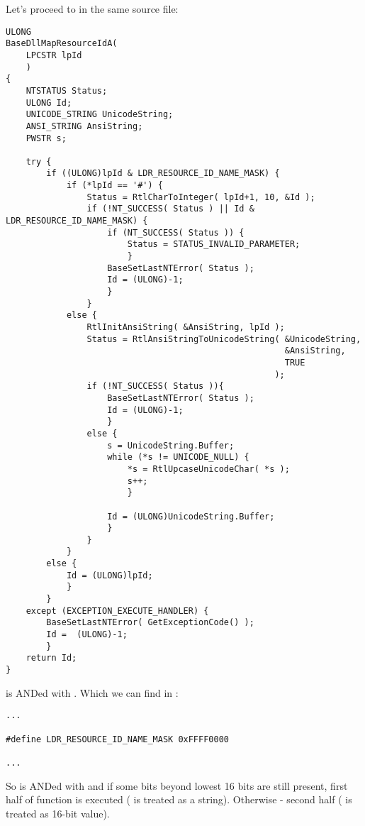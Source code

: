 Let's proceed to  in the same source file:

\begin{lstlisting}
ULONG
BaseDllMapResourceIdA(
    LPCSTR lpId
    )
{
    NTSTATUS Status;
    ULONG Id;
    UNICODE_STRING UnicodeString;
    ANSI_STRING AnsiString;
    PWSTR s;

    try {
        if ((ULONG)lpId & LDR_RESOURCE_ID_NAME_MASK) {
            if (*lpId == '#') {
                Status = RtlCharToInteger( lpId+1, 10, &Id );
                if (!NT_SUCCESS( Status ) || Id & LDR_RESOURCE_ID_NAME_MASK) {
                    if (NT_SUCCESS( Status )) {
                        Status = STATUS_INVALID_PARAMETER;
                        }
                    BaseSetLastNTError( Status );
                    Id = (ULONG)-1;
                    }
                }
            else {
                RtlInitAnsiString( &AnsiString, lpId );
                Status = RtlAnsiStringToUnicodeString( &UnicodeString,
                                                       &AnsiString,
                                                       TRUE
                                                     );
                if (!NT_SUCCESS( Status )){
                    BaseSetLastNTError( Status );
                    Id = (ULONG)-1;
                    }
                else {
                    s = UnicodeString.Buffer;
                    while (*s != UNICODE_NULL) {
                        *s = RtlUpcaseUnicodeChar( *s );
                        s++;
                        }

                    Id = (ULONG)UnicodeString.Buffer;
                    }
                }
            }
        else {
            Id = (ULONG)lpId;
            }
        }
    except (EXCEPTION_EXECUTE_HANDLER) {
        BaseSetLastNTError( GetExceptionCode() );
        Id =  (ULONG)-1;
        }
    return Id;
}
\end{lstlisting}

 is ANDed with . Which we can find in :

\begin{lstlisting}
...

#define LDR_RESOURCE_ID_NAME_MASK 0xFFFF0000

...
\end{lstlisting}

So  is ANDed with  and if some bits beyond lowest 16 bits are still present,
first half of function is executed ( is treated as a string).
Otherwise - second half ( is treated as 16-bit value).

